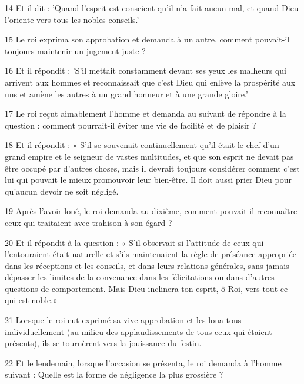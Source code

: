 \par 14 Et il dit : 'Quand l'esprit est conscient qu'il n'a fait aucun mal, et quand Dieu l'oriente vers tous les nobles conseils.'

\par 15 Le roi exprima son approbation et demanda à un autre, comment pouvait-il toujours maintenir un jugement juste ?

\par 16 Et il répondit : 'S'il mettait constamment devant ses yeux les malheurs qui arrivent aux hommes et reconnaissait que c'est Dieu qui enlève la prospérité aux uns et amène les autres à un grand honneur et à une grande gloire.'

\par 17 Le roi reçut aimablement l'homme et demanda au suivant de répondre à la question : comment pourrait-il éviter une vie de facilité et de plaisir ?

\par 18 Et il répondit : « S'il se souvenait continuellement qu'il était le chef d'un grand empire et le seigneur de vastes multitudes, et que son esprit ne devait pas être occupé par d'autres choses, mais il devrait toujours considérer comment c'est lui qui pouvait le mieux promouvoir leur bien-être. Il doit aussi prier Dieu pour qu'aucun devoir ne soit négligé.

\par 19 Après l'avoir loué, le roi demanda au dixième, comment pouvait-il reconnaître ceux qui traitaient avec trahison à son égard ?

\par 20 Et il répondit à la question : « S'il observait si l'attitude de ceux qui l'entouraient était naturelle et s'ils maintenaient la règle de préséance appropriée dans les réceptions et les conseils, et dans leurs relations générales, sans jamais dépasser les limites de la convenance dans les félicitations ou dans d'autres questions de comportement. Mais Dieu inclinera ton esprit, ô Roi, vers tout ce qui est noble.»

\par 21 Lorsque le roi eut exprimé sa vive approbation et les loua tous individuellement (au milieu des applaudissements de tous ceux qui étaient présents), ils se tournèrent vers la jouissance du festin.

\par 22 Et le lendemain, lorsque l'occasion se présenta, le roi demanda à l'homme suivant : Quelle est la forme de négligence la plus grossière ?

